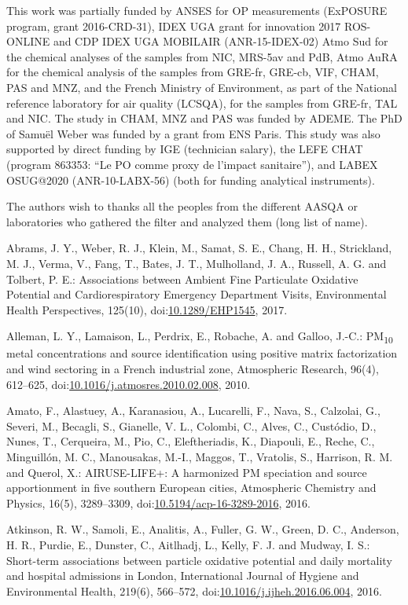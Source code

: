 \documentclass[
]{article}
\begin{document}
This work was partially funded by ANSES for OP measurements (ExPOSURE
program, grant 2016-CRD-31), IDEX UGA grant for innovation 2017
ROS-ONLINE and CDP IDEX UGA MOBILAIR (ANR-15-IDEX-02) Atmo Sud for the
chemical analyses of the samples from NIC, MRS-5av and PdB, Atmo AuRA
for the chemical analysis of the samples from GRE-fr, GRE-cb, VIF, CHAM,
PAS and MNZ, and the French Ministry of Environment, as part of the
National reference laboratory for air quality (LCSQA), for the samples
from GRE-fr, TAL and NIC. The study in CHAM, MNZ and PAS was funded by
ADEME. The PhD of Samuël Weber was funded by a grant from ENS Paris.
This study was also supported by direct funding by IGE (technician
salary), the LEFE CHAT (program 863353: ``Le PO comme proxy de l'impact
sanitaire''), and LABEX OSUG@2020 (ANR-10-LABX-56) (both for funding
analytical instruments).

The authors wish to thanks all the peoples from the different AASQA or
laboratories who gathered the filter and analyzed them (long list of
name).

Abrams, J. Y., Weber, R. J., Klein, M., Samat, S. E., Chang, H. H.,
Strickland, M. J., Verma, V., Fang, T., Bates, J. T., Mulholland, J. A.,
Russell, A. G. and Tolbert, P. E.: Associations between Ambient Fine
Particulate Oxidative Potential and Cardiorespiratory Emergency
Department Visits, Environmental Health Perspectives, 125(10),
doi:\href{https://doi.org/10.1289/EHP1545}{10.1289/EHP1545}, 2017.

Alleman, L. Y., Lamaison, L., Perdrix, E., Robache, A. and Galloo,
J.-C.: PM\textsubscript{10} metal concentrations and source
identification using positive matrix factorization and wind sectoring in
a French industrial zone, Atmospheric Research, 96(4), 612--625,
doi:\href{https://doi.org/10.1016/j.atmosres.2010.02.008}{10.1016/j.atmosres.2010.02.008},
2010.

Amato, F., Alastuey, A., Karanasiou, A., Lucarelli, F., Nava, S.,
Calzolai, G., Severi, M., Becagli, S., Gianelle, V. L., Colombi, C.,
Alves, C., Custódio, D., Nunes, T., Cerqueira, M., Pio, C.,
Eleftheriadis, K., Diapouli, E., Reche, C., Minguillón, M. C.,
Manousakas, M.-I., Maggos, T., Vratolis, S., Harrison, R. M. and Querol,
X.: AIRUSE-LIFE+: A harmonized PM speciation and source apportionment in
five southern European cities, Atmospheric Chemistry and Physics, 16(5),
3289--3309,
doi:\href{https://doi.org/10.5194/acp-16-3289-2016}{10.5194/acp-16-3289-2016},
2016.

Atkinson, R. W., Samoli, E., Analitis, A., Fuller, G. W., Green, D. C.,
Anderson, H. R., Purdie, E., Dunster, C., Aitlhadj, L., Kelly, F. J. and
Mudway, I. S.: Short-term associations between particle oxidative
potential and daily mortality and hospital admissions in London,
International Journal of Hygiene and Environmental Health, 219(6),
566--572,
doi:\href{https://doi.org/10.1016/j.ijheh.2016.06.004}{10.1016/j.ijheh.2016.06.004},
2016.
\end{document}
